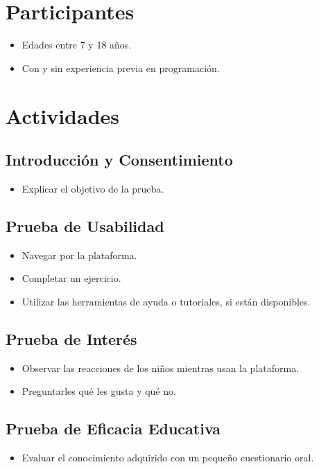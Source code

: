 \begin{appendices}
\section{Participantes}
\begin{itemize}
    \item Edades entre 7 y 18 años.
    \item Con y sin experiencia previa en programación.
\end{itemize}

\section{Actividades}
\subsection*{Introducción y Consentimiento}
\begin{itemize}
    \item Explicar el objetivo de la prueba.
\end{itemize}

\subsection*{Prueba de Usabilidad}
\begin{itemize}
    \item Navegar por la plataforma.
    \item Completar un ejercicio.
    \item Utilizar las herramientas de ayuda o tutoriales, si están disponibles.
\end{itemize}

\subsection*{Prueba de Interés}
\begin{itemize}
    \item Observar las reacciones de los niños mientras usan la plataforma.
    \item Preguntarles qué les gusta y qué no.
\end{itemize}

\subsection*{Prueba de Eficacia Educativa}
\begin{itemize}
    \item Evaluar el conocimiento adquirido con un pequeño cuestionario oral.
\end{itemize}


\end{appendices}

